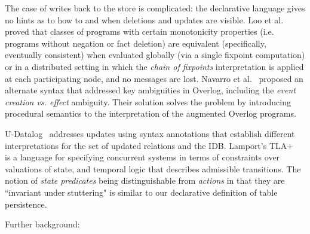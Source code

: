 The case of writes back to the store is complicated: the declarative language gives no hints as to how to and when deletions and updates
are visible.  Loo et al.~\cite{loo-sigmod06} proved that classes of programs with certain monotonicity properties (i.e. programs without negation or fact deletion)
are equivalent (specifically, eventually consistent) when evaluated globally (via a single fixpoint computation) or in a distributed setting in which the 
\emph{chain of fixpoints} interpretation is applied at each participating node, and no messages are lost.
Navarro et al.~\cite{navarro} proposed an alternate syntax that addressed key ambiguities in Overlog, including the
\emph{event creation vs. effect} ambiguity.  Their solution solves the problem by introducing procedural semantics to the interpretation of 
the augmented Overlog programs.


U-Datalog~\cite{udatalog-neg} addresses updates using syntax annotations that establish different interpretations for the set of updated 
relations and the IDB.  Lamport's TLA+~\cite{tla} is a language for specifying concurrent systems in terms of constraints over valuations of
state, and temporal logic that describes admissible transitions.  The notion of \emph{state predicates} being distinguishable from \emph{actions}
in that they are ``invariant under stuttering" is similar to our declarative definition of table persistence.  

Further background: \cite{tccp,tdccp,prz, constructivism}